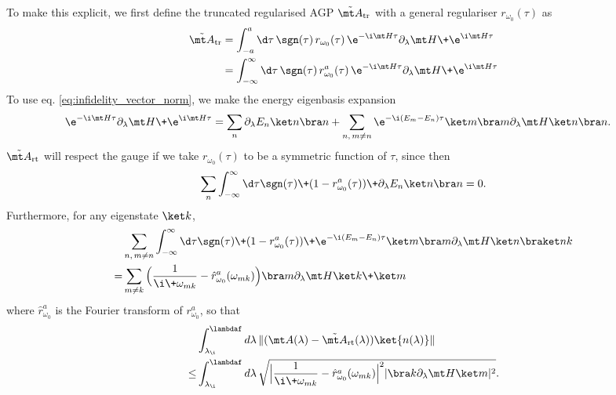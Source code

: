 To make this explicit, we first define the truncated regularised AGP $\tilde{\mt A}_{\rm tr}$ with a general regulariser $r_{\omega_0}(\tau)$ as 
\begin{align}
    \tilde{\mt A}_{\rm tr} &= \int_{-a}^a \d\tau \, \sgn(\tau) \, r_{\omega_0}(\tau) \, \e^{-\i\mt H\tau} \partial_\lambda \mt H \+ \e^{\i\mt H\tau} \nonumber \\
    &= \int_{-\infty}^\infty \d\tau \, \sgn(\tau) \, r_{\omega_0}^a(\tau) \, \e^{-\i\mt H\tau} \partial_\lambda \mt H \+ \e^{\i\mt H\tau}
\end{align}
 To use eq. \ref{eq:infidelity_vector_norm}, we make the energy eigenbasis expansion
\begin{align} \label{eq:time_translated_dlambdaH_energy_eigenbasis}
    \e^{-\i\mt H\tau} \partial_\lambda \mt H \+ \e^{\i\mt H\tau}
    &= \sum_n \partial_\lambda E_n \ket n\bra n + \sum_{n, \, m\neq n} \e^{-\i (E_m - E_n) \tau} \ket m \bra m \partial_\lambda \mt H \ket n \bra n.
\end{align}
$\tilde{\mt A}_{\rm rt}$ will respect the gauge if we take $r_{\omega_0}(\tau)$ to be a symmetric function of $\tau$, since then
\begin{align}
    \sum_n \int_{-\infty}^\infty \d\tau \sgn(\tau) \+ (1 - r_{\omega_0}^a(\tau)) \+ \partial_\lambda E_n \ket n \bra n = 0.
\end{align}
Furthermore, for any eigenstate $\ket k$,
\begin{align}
    & \sum_{n, \, m\neq n} \int_{-\infty}^\infty \d\tau \sgn(\tau) \+ (1 - r_{\omega_0}^a(\tau)) \+ \e^{-\i (E_m - E_n) \tau} \ket m \bra m \partial_\lambda \mt H \ket n \braket nk \nonumber \\
    =& \sum_{m\neq k} \Big( \frac1{\i \+ \omega_{mk}} - \hat r_{\omega_0}^a(\omega_{mk}) \Big) \bra m \partial_\lambda \mt H \ket k \+ \ket m
\end{align}
where $\hat r_{\omega_0}^a$ is the Fourier transform of $r_{\omega_0}^a$, so that
\begin{align}
    &\int_{\lambda_{\rm \i}}^{\lambdaf} d\lambda \, \|(\mt A(\lambda) - \tilde{\mt A}_{\rm rt}(\lambda)) \ket{n(\lambda)}\| \nonumber \\
    \leq& \int_{\lambda_{\rm \i}}^{\lambdaf} d\lambda \, \sqrt{\Big| \frac1{\i \+ \omega_{mk}} - \hat r_{\omega_0}^a(\omega_{mk}) \Big|^2 |\bra k\partial_\lambda\mt H\ket m|^2}.
\end{align}
